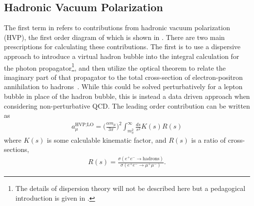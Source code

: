 \subsection*{Hadronic Vacuum Polarization}
\label{subsec:HVP}

The first term in  refers to contributions from hadronic vacuum polarization (HVP), the first order diagram of which is shown in . There are two main prescriptions for calculating these contributions. The first is to use a dispersive approach to introduce a virtual hadron bubble into the integral calculation for the photon propagator\footnote{The details of dispersion theory will not be described here but a pedagogical introduction is given in .}, and then utilize the optical theorem to relate the imaginary part of that propagator to the total cross-section of electron-positron annihilation to hadrons~\cite{Jeger}. While this could be solved perturbatively for a lepton bubble in place of the hadron bubble, this is instead a data driven approach when considering non-perturbative QCD. The leading order contribution can be written as 
		\begin{align}
            a_{\mu}^{\text{HVP;LO}} = \Big(\frac{\alpha m_{\mu}}{3\pi}\Big)^{2} \int_{m_{\pi}^{2}}^{\infty} \frac{ds}{s^{2}} K(s) R(s)
		\end{align}
where $K(s)$ is some calculable kinematic factor, and $R(s)$ is a ratio of cross-sections,
		\begin{align} \label{eq:Rcrosssection}
            R(s) = \frac{\sigma(e^{+}e^{-} \rightarrow \text{hadrons})}{\sigma(e^{+}e^{-} \rightarrow \mu^{+}\mu^{-})}.
		\end{align}


